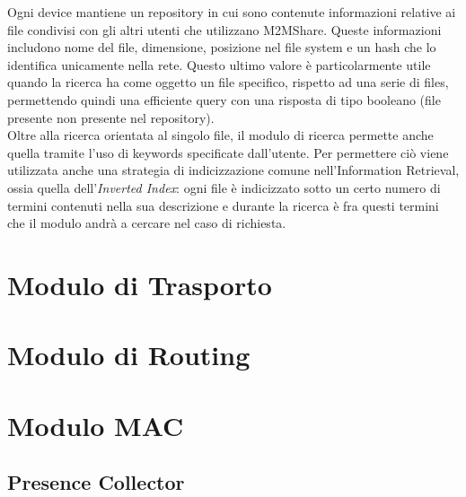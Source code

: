 Ogni device mantiene un repository in cui sono contenute informazioni relative ai file condivisi con gli altri utenti che utilizzano M2MShare. Queste informazioni includono nome del file, dimensione, posizione nel file system e un hash che lo identifica unicamente nella rete. Questo ultimo valore \`{e} particolarmente utile quando la ricerca ha come oggetto un file specifico, rispetto ad una serie di files, permettendo quindi una efficiente query con una risposta di tipo booleano (file presente \/ non presente nel repository).
\\
Oltre alla ricerca orientata al singolo file, il modulo di ricerca permette anche quella tramite l'uso di keywords specificate dall'utente. Per permettere ci\`{o} viene utilizzata anche una strategia di indicizzazione comune nell'Information Retrieval, ossia quella dell'\textit{Inverted Index}: ogni file \`{e} indicizzato sotto un certo numero di termini contenuti nella sua descrizione e durante la ricerca \`{e} fra questi termini che il modulo andrà a cercare nel caso di richiesta. 


\section{Modulo di Trasporto}
\section{Modulo di Routing}
\section{Modulo MAC}

\subsection{Presence Collector} 
\label{descrPresenceCollector}
 

